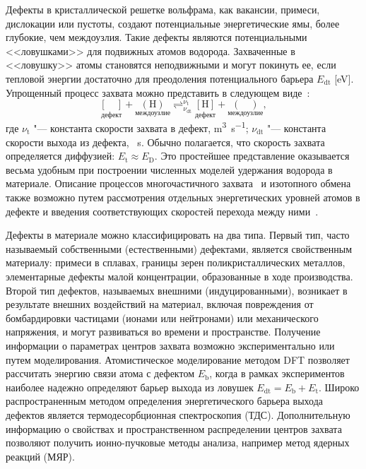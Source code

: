 Дефекты в кристаллической решетке вольфрама, как вакансии, примеси, дислокации или пустоты, создают потенциальные энергетические ямы, более глубокие, чем междоузлия. Такие дефекты являются потенциальными <<ловушками>> для подвижных атомов водорода. Захваченные в <<ловушку>> атомы становятся неподвижными и могут покинуть ее, если тепловой энергии достаточно для преодоления потенциального барьера $E_\mathrm{dt}$ [\si{\electronvolt}]. Упрощенный процесс захвата можно представить в следующем виде~\cite{Drexler2020}:
\begin{equation*}
    \underset{\text{дефект}}{[\quad]} + \underset{\text{междоузлие}}{(\mathrm{H})} \mathop{\rightleftharpoons}^{\nu_\mathrm{t}}_{\nu_\mathrm{dt}}  \underset{\text{дефект}}{[\mathrm{H}]} +  \underset{\text{междоузлие}}{(\quad)},
\end{equation*}
где \( \nu_\mathrm{t} \) "--- константа скорости захвата в дефект, \si{\metre\cubed\per\second}; \( \nu_\mathrm{dt}\) "--- константа скорости выхода из дефекта, \si{\per\second}. Обычно полагается, что скорость захвата определяется диффузией: \( E_\mathrm{t} \approx E_\mathrm{D} \). Это простейшее представление оказывается весьма удобным при построении численных моделей удержания водорода в материале. Описание процессов многочастичного захвата~\cite{Johnson2010,Fernandez2015} и изотопного обмена также возможно путем рассмотрения отдельных энергетических уровней атомов в дефекте и введения соответствующих скоростей перехода между ними~\cite{Schmid2014}.

Дефекты в материале можно классифицировать на два типа. Первый тип, часто называемый собственными (естественными) дефектами, является свойственным материалу: примеси в сплавах, границы зерен поликристаллических металлов, элементарные дефекты малой концентрации, образованные в ходе производства. Второй тип дефектов, называемых внешними (индуцированными), возникает в результате внешних воздействий на материал, включая повреждения от бомбардировки частицами (ионами или нейтронами) или механического напряжения, и могут развиваться во времени и пространстве. Получение информации о параметрах центров захвата возможно экспериментально или путем моделирования. Атомистическое моделирование методом DFT позволяет рассчитать энергию связи атома с дефектом \( E_\mathrm{b} \), когда в рамках экспериментов наиболее надежно определяют барьер выхода из ловушек \( E_\mathrm{dt}=E_\mathrm{b} + E_\mathrm{t} \). Широко распространенным методом определения энергетического барьера выхода дефектов является термодесорбционная спектроскопия (ТДС). Дополнительную информацию о свойствах и пространственном распределении центров захвата позволяют получить ионно-пучковые методы анализа, например метод ядерных реакций (МЯР). 

